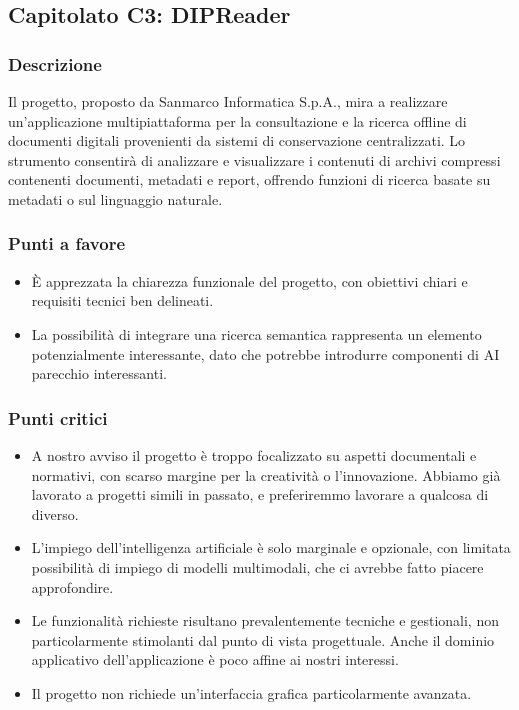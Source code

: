 \documentclass[a4paper,12pt]{article}
\begin{document}
\subsection{Capitolato C3: DIPReader}

\subsubsection{Descrizione}
Il progetto, proposto da Sanmarco Informatica S.p.A., mira a realizzare un’applicazione multipiattaforma per la consultazione e la ricerca offline di documenti digitali provenienti da sistemi di conservazione centralizzati. Lo strumento consentirà di analizzare e visualizzare i contenuti di archivi compressi contenenti documenti, metadati e report, offrendo funzioni di ricerca basate su metadati o sul linguaggio naturale.

\subsubsection{Punti a favore}
\begin{itemize}
    \item È apprezzata la chiarezza funzionale del progetto, con obiettivi chiari e requisiti tecnici ben delineati.
    \item La possibilità di integrare una ricerca semantica rappresenta un elemento potenzialmente interessante, dato che potrebbe introdurre componenti di AI parecchio interessanti.
\end{itemize}

\subsubsection{Punti critici}
\begin{itemize}
    \item A nostro avviso il progetto è troppo focalizzato su aspetti documentali e normativi, con scarso margine per la creatività o l’innovazione. Abbiamo già lavorato a progetti simili in passato, e preferiremmo lavorare a qualcosa di diverso.
    \item L’impiego dell’intelligenza artificiale è solo marginale e opzionale, con limitata possibilità di impiego di modelli multimodali, che ci avrebbe fatto piacere approfondire.
    \item Le funzionalità richieste risultano prevalentemente tecniche e gestionali, non particolarmente stimolanti dal punto di vista progettuale. Anche il dominio applicativo dell’applicazione è poco affine ai nostri interessi.
    \item Il progetto non richiede un’interfaccia grafica particolarmente avanzata.
\end{itemize}
\end{document}
